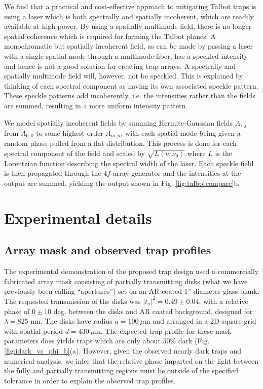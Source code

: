 We find that a practical and cost-effective approach to mitigating Talbot traps is using a laser which is both spectrally and spatially incoherent, which are readily available at high power. By using a spatially  multimode field, there is no longer spatial coherence which is required for forming the Talbot planes. A monochromatic but spatially incoherent field, as can be made by passing a laser with a single spatial mode through a  multimode fiber, has a speckled intensity and hence is not a good solution for creating trap arrays. A spectrally and spatially  multimode field will, however, not be speckled. This is explained by thinking of each spectral component as having its own associated speckle pattern. These speckle patterns add incoherently, i.e. the intensities rather than the fields are summed, resulting in a more uniform intensity pattern.

We model spatially incoherent fields by summing Hermite-Gaussian fields $A_{i,j}$ from $A_{0,0}$ to some highest-order $A_{m,n}$, with each spatial mode being given a random phase pulled from a flat distribution.  This process is done for each spectral component of the field and scaled by $\sqrt{L(\nu, \nu_0)}$ where $L$ is the Lorentzian function describing the spectral width of the laser. Each speckle field is then propagated through the $4f$ array generator and the intensities at the output are summed, yielding the output shown in Fig. \ref{fig:talbotcompare}b.

\section{Experimental details}\label{sec:experiment}

\subsection{Array mask and observed trap profiles}\label{sub:profiles}
The experimental demonstration of the proposed trap design used a commercially fabricated array mask consisting of partially transmitting disks (what we have previously been calling ``apertures'') set on an AR-coated 1'' diameter glass blank. The requested transmission of the disks was $|t_a|^2=0.49\pm 0.04$, with a relative phase of $0 \pm 10 $ deg. between the disks and AR coated background, designed for $\lambda = 825$ nm. The disks have radius $a=100~\mu$m and arranged in a 2D square grid with spatial period $d=430~\mu$m. The expected trap profile for these mask parameters does yields traps which are only about 50$\%$ dark (Fig. \ref{fig:idark_vs_phi_b}(a). However, given the observed nearly dark traps and numerical analysis, we infer that the relative phase imparted on the light between the fully and partially transmitting regions must be outside of the specified tolerance in order to explain the observed trap profiles. 

